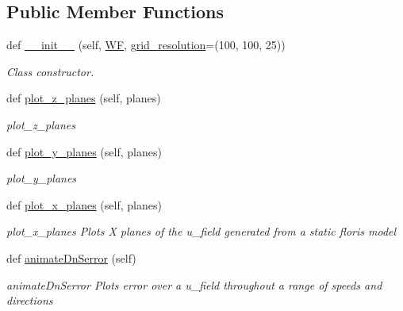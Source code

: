 \subsection*{Public Member Functions}
\begin{DoxyCompactItemize}
\item 
def \mbox{\hyperlink{classvisualization__manager___d_j_1_1_visualization_manager_ac262d79ceedca2ca4dd92b078a0851f1}{\+\_\+\+\_\+init\+\_\+\+\_\+}} (self, \mbox{\hyperlink{classvisualization__manager___d_j_1_1_visualization_manager_a56add1b450c7ecd758b096117f593578}{WF}}, \mbox{\hyperlink{classvisualization__manager___d_j_1_1_visualization_manager_ad5b8013f5cdf47f6384ae56186810e2b}{grid\+\_\+resolution}}=(100, 100, 25))
\begin{DoxyCompactList}\small\item\em Class constructor. \end{DoxyCompactList}\item 
def \mbox{\hyperlink{classvisualization__manager___d_j_1_1_visualization_manager_a05c519f1e0389278308ee046d27724cd}{plot\+\_\+z\+\_\+planes}} (self, planes)
\begin{DoxyCompactList}\small\item\em plot\+\_\+z\+\_\+planes \end{DoxyCompactList}\item 
def \mbox{\hyperlink{classvisualization__manager___d_j_1_1_visualization_manager_ab0047d9eeda14999bdf8f8de191d9a33}{plot\+\_\+y\+\_\+planes}} (self, planes)
\begin{DoxyCompactList}\small\item\em plot\+\_\+y\+\_\+planes \end{DoxyCompactList}\item 
def \mbox{\hyperlink{classvisualization__manager___d_j_1_1_visualization_manager_a4705f5926bdcecfd8d2d5aff434b2120}{plot\+\_\+x\+\_\+planes}} (self, planes)
\begin{DoxyCompactList}\small\item\em plot\+\_\+x\+\_\+planes Plots X planes of the u\+\_\+field generated from a static floris model \end{DoxyCompactList}\item 
def \mbox{\hyperlink{classvisualization__manager___d_j_1_1_visualization_manager_ab660449be49e49325d864dd1176e83f0}{animate\+Dn\+Serror}} (self)
\begin{DoxyCompactList}\small\item\em animate\+Dn\+Serror Plots error over a u\+\_\+field throughout a range of speeds and directions \end{DoxyCompactList}\item 

\end{DoxyCompactItemize}
